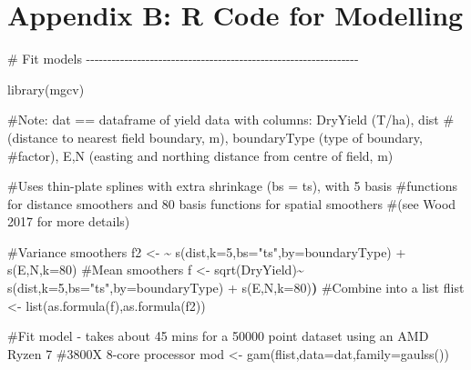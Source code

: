 \documentclass[]{elsarticle} %
\newenvironment{Shaded}{}{}
\newcommand{\AttributeTok}[1]{#1}
\newcommand{\CommentTok}[1]{\textcolor[rgb]{0.00,0.50,0.00}{#1}}
\newcommand{\ErrorTok}[1]{\textcolor[rgb]{1.00,0.00,0.00}{\textbf{#1}}}
\newcommand{\FunctionTok}[1]{#1}
\newcommand{\NormalTok}[1]{#1}
\newcommand{\OtherTok}[1]{\textcolor[rgb]{1.00,0.25,0.00}{#1}}
\newcommand{\StringTok}[1]{\textcolor[rgb]{0.00,0.50,0.50}{#1}}
\begin{document}
\hypertarget{appendix-b-r-code-for-modelling}{%
\section*{Appendix B: R Code for Modelling}\label{appendix-b-r-code-for-modelling}}

\begin{Shaded}
\begin{Highlighting}[]
\CommentTok{\# Fit models {-}{-}{-}{-}{-}{-}{-}{-}{-}{-}{-}{-}{-}{-}{-}{-}{-}{-}{-}{-}{-}{-}{-}{-}{-}{-}{-}{-}{-}{-}{-}{-}{-}{-}{-}{-}{-}{-}{-}{-}{-}{-}{-}{-}{-}{-}{-}{-}{-}{-}{-}{-}{-}{-}{-}{-}{-}{-}{-}{-}{-}{-}{-}{-}}

\FunctionTok{library}\NormalTok{(mgcv)}

\CommentTok{\#Note: dat == dataframe of yield data with columns: DryYield (T/ha), dist}
\CommentTok{\#(distance to nearest field boundary, m), boundaryType (type of boundary,}
\CommentTok{\#factor), E,N (easting and northing distance from centre of field, m)}

\CommentTok{\#Uses thin{-}plate splines with extra shrinkage (bs = \textquotesingle{}ts\textquotesingle{}), with 5 basis}
\CommentTok{\#functions for distance smoothers and 80 basis functions for spatial smoothers}
\CommentTok{\#(see Wood 2017 for more details)}

\CommentTok{\#Variance smoothers}
\NormalTok{f2 }\OtherTok{\textless{}{-}} \StringTok{\textquotesingle{}\textasciitilde{} s(dist,k=5,bs="ts",by=boundaryType) + s(E,N,k=80)\textquotesingle{}} 
\CommentTok{\#Mean smoothers}
\NormalTok{f }\OtherTok{\textless{}{-}} \StringTok{\textquotesingle{}sqrt(DryYield)\textasciitilde{} s(dist,k=5,bs="ts",by=boundaryType) + s(E,N,k=80)\textquotesingle{}}\ErrorTok{)} 
\CommentTok{\#Combine into a list}
\NormalTok{flist }\OtherTok{\textless{}{-}} \FunctionTok{list}\NormalTok{(}\FunctionTok{as.formula}\NormalTok{(f),}\FunctionTok{as.formula}\NormalTok{(f2)) }

\CommentTok{\#Fit model {-} takes about 45 mins for a 50000 point dataset using an AMD Ryzen 7}
\CommentTok{\#3800X 8{-}core processor}
\NormalTok{mod }\OtherTok{\textless{}{-}} \FunctionTok{gam}\NormalTok{(flist,}\AttributeTok{data=}\NormalTok{dat,}\AttributeTok{family=}\FunctionTok{gaulss}\NormalTok{()) }
\end{Highlighting}
\end{Shaded}
\end{document}
